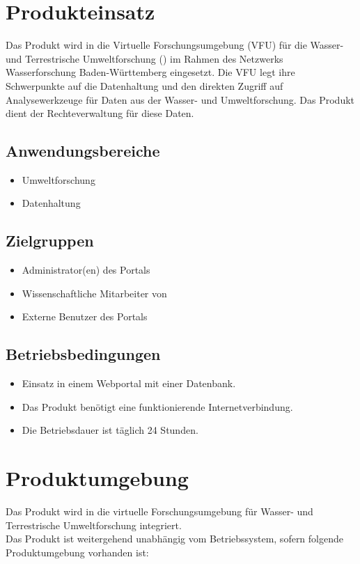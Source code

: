 \documentclass[parskip=full,11pt]{scrartcl}
\begin{document}
\section{Produkteinsatz}
Das Produkt wird in die Virtuelle Forschungsumgebung (VFU) für die Wasser-
und Terrestrische Umweltforschung (\grqq) im Rahmen des Netzwerks
Wasserforschung Baden-Württemberg eingesetzt. Die VFU legt ihre Schwerpunkte
auf die Datenhaltung und den direkten Zugriff auf Analysewerkzeuge für Daten
aus der Wasser- und Umweltforschung. Das Produkt dient der
Rechteverwaltung für diese Daten.

\subsection{Anwendungsbereiche}
\begin{itemize}[itemsep=0pt]
\item Umweltforschung
\item Datenhaltung
\end{itemize}

\subsection{Zielgruppen}
\begin{itemize}[itemsep=0pt]
\item Administrator(en) des Portals %
\item Wissenschaftliche Mitarbeiter von \grqq
\item Externe Benutzer des Portals
\end{itemize}
\newpage
\subsection{Betriebsbedingungen}
\begin{itemize}[itemsep=0pt]
\item Einsatz in einem Webportal mit einer \gls{Datenbank}.
\item Das Produkt benötigt eine funktionierende Internetverbindung.
\item Die Betriebsdauer ist täglich 24 Stunden.
\end{itemize}


\section{Produktumgebung}
Das Produkt wird in die virtuelle Forschungsumgebung für Wasser- und Terrestrische Umweltforschung \grqq \: integriert.\\
Das Produkt ist weitergehend unabhängig vom Betriebssystem, sofern folgende Produktumgebung vorhanden ist:
\end{document}
